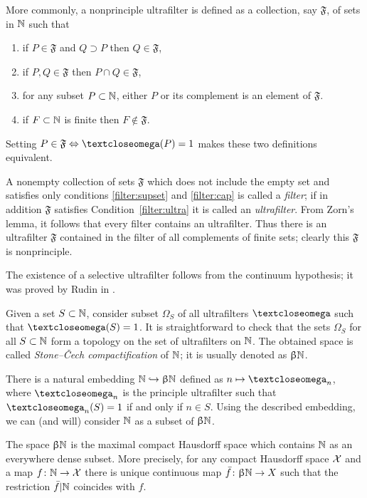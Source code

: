 More commonly, a nonprinciple ultrafilter is defined as a collection, say $\mathfrak{F}$, of sets in $\mathbb{N}$ such that
\begin{enumerate}
\item\label{filter:supset} if $P\in \mathfrak{F}$ and $Q\supset P$ then $Q\in \mathfrak{F}$,
\item\label{filter:cap} if $P, Q\in \mathfrak{F}$ then $P\cap Q\in \mathfrak{F}$,
\item\label{filter:ultra} for any subset $P\subset\NN$, either $P$ or its complement is an element of $\mathfrak{F}$.
\item\label{filter:non-prin} if $F\subset \NN $ is finite then $F\notin \mathfrak{F}$.
\end{enumerate}
Setting $P\in\mathfrak{F}\Leftrightarrow\o(P)=1$ makes these two definitions equivalent.

A nonempty collection of sets $\mathfrak{F}$ which does not include the empty set and satisfies only conditions \ref{filter:supset} and \ref{filter:cap} is called a \emph{filter}; 
if in addition $\mathfrak{F}$ satisfies Condition~\ref{filter:ultra} it is called an \emph{ultrafilter}.
From Zorn's lemma, it follows that every filter contains an ultrafilter.
Thus there is an ultrafilter $\mathfrak{F}$ contained in the filter of all complements of finite sets; clearly this $\mathfrak{F}$ is nonprinciple.

The existence of a selective ultrafilter follows from the continuum hypothesis;
it was proved by  Rudin in \cite{rudin}.

Given a set $S\subset \NN$, consider subset $\Omega_S$ of all ultrafilters $\o$ such that $\o(S)=1$.
It is straightforward to check that the sets $\Omega_S$ for all $S\subset \NN$ form a topology on the set of ultrafilters on $\mathbb{N}$. 
The obtained space is called \emph{Stone--\v{C}ech compactification} of $\mathbb{N}$;
it is usually denoted as $\upbeta\mathbb{N}$.

There is a natural embedding $\NN\hookrightarrow\beta\NN$ defined as
$n\mapsto\o_n$, where $\o_n$ is the principle ultrafilter such that $\o_n(S)=1$ if and only if $n\in S$. 
Using the described embedding, we can (and will) consider $\mathbb{N}$ as a subset of $\upbeta\mathbb{N}$.

The space $\upbeta\mathbb{N}$ is the maximal compact Hausdorff space which contains $\mathbb{N}$  as an everywhere dense subset.
More precisely, for any compact Hausdorff space $\mathcal{X}$ 
and a map $f\:\NN\to \spc{X}$ there is unique continuous map $\bar f\:\beta\NN\to X$ such that the restriction $\bar f|\mathbb{N}$ coincides with $f$. 

